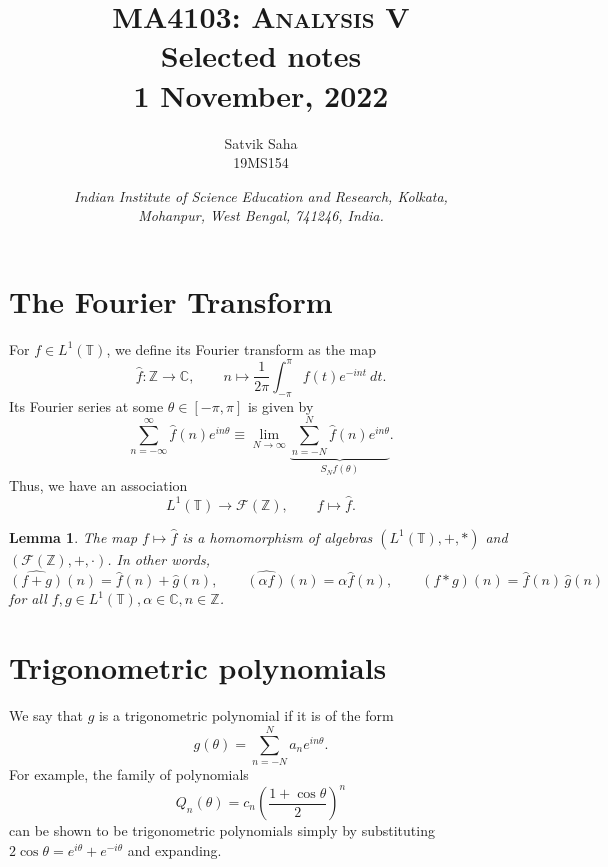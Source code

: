 \documentclass[11pt]{article}
\title{
    \Large\textsc{MA4103: Analysis V} \\
    \Huge \textbf{Selected notes} \\
    \vspace{5pt}
    \Large{1 November, 2022}
}
\author{
    \large Satvik Saha
    \\\textsc{\small 19MS154}
}
\date{\normalsize
    \textit{Indian Institute of Science Education and Research, Kolkata, \\
    Mohanpur, West Bengal, 741246, India.} \\
}
\newtheorem*{lemma}{Lemma}
\theoremstyle{definition}
\theoremstyle{remark}
\begin{document}
    \maketitle

    \section*{The Fourier Transform}

    For $f \in L^1(\mathbb{T})$, we define its Fourier transform as the map \[
        \hat{f}\colon \mathbb{Z} \to \mathbb{C}, \qquad
        n \mapsto \frac{1}{2\pi} \int_{-\pi}^{\pi} f(t) e^{-int} \:dt.
    \] Its Fourier series at some $\theta \in [-\pi, \pi]$ is given by \[
        \sum_{n = -\infty}^{\infty} \hat{f}(n) e^{in\theta} \equiv
        \lim_{N \to \infty} \underbrace{\sum_{n = -N}^{N} \hat{f}(n)
        e^{in\theta}}_{S_N f(\theta)}.
    \] Thus, we have an association \[
        L^1(\mathbb{T}) \to \mathscr{F}(\mathbb{Z}), \qquad
        f \mapsto \hat{f}.
    \]

    \begin{lemma}
        The map $f \mapsto \hat{f}$ is a homomorphism of algebras
        $(L^1(\mathbb{T}), +, *)$ and $(\mathscr{F}(\mathbb{Z}), +, \cdot)$. In other
        words, \[
            \widehat{(f + g)}(n) = \hat{f}(n) + \hat{g}(n), \qquad
            \widehat{(\alpha f)}(n) = \alpha \hat{f}(n), \qquad
            \widehat{(f * g)}(n) = \hat{f}(n)\, \hat{g}(n)
        \] for all $f, g \in L^1(\mathbb{T}), \alpha \in \mathbb{C}, n \in
        \mathbb{Z}$.
    \end{lemma}

    \section*{Trigonometric polynomials}

    We say that $g$ is a trigonometric polynomial if it is of the form \[
        g(\theta) = \sum_{n = -N}^N a_n e^{in\theta}.
    \] For example, the family of polynomials \[
        Q_n(\theta) = c_n\left(\frac{1 + \cos\theta}{2}\right)^n
    \] can be shown to be trigonometric polynomials simply by substituting
    $2\cos\theta = e^{i\theta} + e^{-i\theta}$ and expanding.
\end{document}
